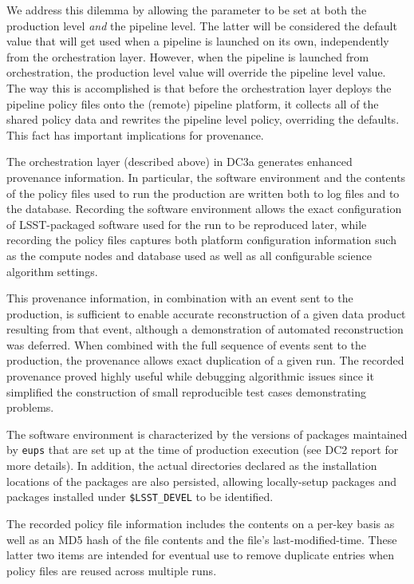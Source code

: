We address this dilemma by allowing the parameter to be set at both
the production level {\it and} the pipeline level.  The latter will be
considered the default value that will get used when a pipeline is
launched on its own, independently from the orchestration layer.
However, when the pipeline is launched from orchestration, the
production level value will override the pipeline level value.  The
way this is accomplished is that before the orchestration layer
deploys the pipeline policy files onto the (remote) pipeline platform,
it collects all of the shared policy data and rewrites the pipeline
level policy, overriding the defaults.  This fact has important
implications for provenance.  


  \label{sec:provenance}

The orchestration layer (described above) in DC3a generates enhanced
provenance information.  In particular, the software environment and
the contents of the policy files used to run the production are
written both to log files and to the database.  Recording the software
environment allows the exact configuration of LSST-packaged software
used for the run to be reproduced later, while recording the policy
files captures both platform configuration information such as the
compute nodes and database used as well as all configurable science
algorithm settings.

This provenance information, in combination with an event sent to the
production, is sufficient to enable accurate reconstruction of a given
data product resulting from that event, although a demonstration of
automated reconstruction was deferred.  When combined with the full
sequence of events sent to the production, the provenance allows exact
duplication of a given run.  The recorded provenance proved highly
useful while debugging algorithmic issues since it simplified the
construction of small reproducible test cases demonstrating problems.

The software environment is characterized by the versions of packages
maintained by {\tt eups} that are set up at the time of production
execution (see DC2 report for more details).  In addition, the actual
directories declared as the installation locations of the packages are
also persisted, allowing locally-setup packages and packages installed
under {\tt \$LSST\_DEVEL} to be identified.  

The recorded policy file information includes the contents on a per-key
basis as well as an MD5 hash of the file contents and the file's
last-modified-time.  These latter two items are intended for eventual
use to remove duplicate entries when policy files are reused across
multiple runs.

